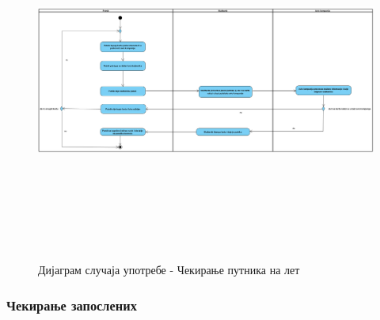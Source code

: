\documentclass{article}
\begin{document}
\begin{figure}[H]
    \centering
    \includegraphics[width=1.1\textwidth, height=12cm]{Dijagrami_slike/cekiranje_putnika.png}
    \caption{Дијаграм случаја употребе - Чекирање путника на лет}
\end{figure}

\newpage
\subsubsection{Чекирање запослених}
\end{document}
